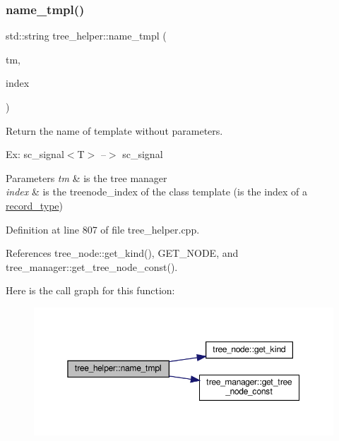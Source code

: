 \mbox{\label{classtree__helper_a8bf8008c24c142ff7aba3b4cbaa43f66}} 
\subsubsection{\texorpdfstring{name\+\_\+tmpl()}{name\_tmpl()}}
{\footnotesize\ttfamily std\+::string tree\+\_\+helper\+::name\+\_\+tmpl (\begin{DoxyParamCaption}\item[{const \hyperlink{tree__manager_8hpp_a792e3f1f892d7d997a8d8a4a12e39346}{tree\+\_\+manager\+Const\+Ref}}]{tm,  }\item[{const unsigned int}]{index }\end{DoxyParamCaption})\hspace{0.3cm}{\ttfamily [static]}}



Return the name of template without parameters. 

Ex\+: sc\+\_\+signal$<$\+T$>$ --$>$ sc\+\_\+signal 
\begin{DoxyParams}{Parameters}
{\em tm} & is the tree manager \\
\hline
{\em index} & is the treenode\+\_\+index of the class template (is the index of a \hyperlink{structrecord__type}{record\+\_\+type}) \\
\hline
\end{DoxyParams}


Definition at line 807 of file tree\+\_\+helper.\+cpp.



References tree\+\_\+node\+::get\+\_\+kind(), G\+E\+T\+\_\+\+N\+O\+DE, and tree\+\_\+manager\+::get\+\_\+tree\+\_\+node\+\_\+const().

Here is the call graph for this function\+:
\nopagebreak
\begin{figure}[H]
\begin{center}
\leavevmode
\includegraphics[width=350pt]{d7/d99/classtree__helper_a8bf8008c24c142ff7aba3b4cbaa43f66_cgraph}
\end{center}
\end{figure}
\mbox{\label{classtree__helper_aee00603ba1624687633e55453f315687}} 
